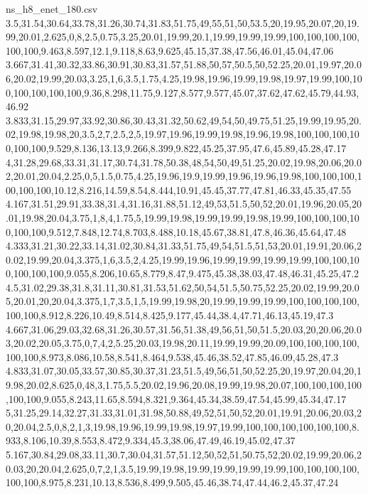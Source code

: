 \begin{filecontents*}[overwrite]{ns_h8_enet_180.csv}
3.5,31.54,30.64,33.78,31.26,30.74,31.83,51.75,49,55,51,50,53.5,20,19.95,20.07,20,19.99,20.01,2.625,0,8,2.5,0.75,3.25,20.01,19.99,20.1,19.99,19.99,19.99,100,100,100,100,100,100,9.463,8.597,12.1,9.118,8.63,9.625,45.15,37.38,47.56,46.01,45.04,47.06
3.667,31.41,30.32,33.86,30.91,30.83,31.57,51.88,50,57,50.5,50,52.25,20.01,19.97,20.06,20.02,19.99,20.03,3.25,1,6,3.5,1.75,4.25,19.98,19.96,19.99,19.98,19.97,19.99,100,100,100,100,100,100,9.36,8.298,11.75,9.127,8.577,9.577,45.07,37.62,47.62,45.79,44.93,46.92
3.833,31.15,29.97,33.92,30.86,30.43,31.32,50.62,49,54,50,49.75,51.25,19.99,19.95,20.02,19.98,19.98,20,3.5,2,7,2.5,2,5,19.97,19.96,19.99,19.98,19.96,19.98,100,100,100,100,100,100,9.529,8.136,13.13,9.266,8.399,9.822,45.25,37.95,47.6,45.89,45.28,47.17
4,31.28,29.68,33.31,31.17,30.74,31.78,50.38,48,54,50,49,51.25,20.02,19.98,20.06,20.02,20.01,20.04,2.25,0,5,1.5,0.75,4.25,19.96,19.9,19.99,19.96,19.96,19.98,100,100,100,100,100,100,10.12,8.216,14.59,8.54,8.444,10.91,45.45,37.77,47.81,46.33,45.35,47.55
4.167,31.51,29.91,33.38,31.4,31.16,31.88,51.12,49,53,51.5,50,52,20.01,19.96,20.05,20.01,19.98,20.04,3.75,1,8,4,1.75,5,19.99,19.98,19.99,19.99,19.98,19.99,100,100,100,100,100,100,9.512,7.848,12.74,8.703,8.488,10.18,45.67,38.81,47.8,46.36,45.64,47.48
4.333,31.21,30.22,33.14,31.02,30.84,31.33,51.75,49,54,51.5,51,53,20.01,19.91,20.06,20.02,19.99,20.04,3.375,1,6,3.5,2,4.25,19.99,19.96,19.99,19.99,19.99,19.99,100,100,100,100,100,100,9.055,8.206,10.65,8.779,8.47,9.475,45.38,38.03,47.48,46.31,45.25,47.2
4.5,31.02,29.38,31.8,31.11,30.81,31.53,51.62,50,54,51.5,50.75,52.25,20.02,19.99,20.05,20.01,20,20.04,3.375,1,7,3.5,1,5,19.99,19.98,20,19.99,19.99,19.99,100,100,100,100,100,100,8.912,8.226,10.49,8.514,8.425,9.177,45.44,38.4,47.71,46.13,45.19,47.3
4.667,31.06,29.03,32.68,31.26,30.57,31.56,51.38,49,56,51,50,51.5,20.03,20,20.06,20.03,20.02,20.05,3.75,0,7,4,2,5.25,20.03,19.98,20.11,19.99,19.99,20.09,100,100,100,100,100,100,8.973,8.086,10.58,8.541,8.464,9.538,45.46,38.52,47.85,46.09,45.28,47.3
4.833,31.07,30.05,33.57,30.85,30.37,31.23,51.5,49,56,51,50,52.25,20,19.97,20.04,20,19.98,20.02,8.625,0,48,3,1.75,5.5,20.02,19.96,20.08,19.99,19.98,20.07,100,100,100,100,100,100,9.055,8.243,11.65,8.594,8.321,9.364,45.34,38.59,47.54,45.99,45.34,47.17
5,31.25,29.14,32.27,31.33,31.01,31.98,50.88,49,52,51,50,52,20.01,19.91,20.06,20.03,20,20.04,2.5,0,8,2,1,3,19.98,19.96,19.99,19.98,19.97,19.99,100,100,100,100,100,100,8.933,8.106,10.39,8.553,8.472,9.334,45.3,38.06,47.49,46.19,45.02,47.37
5.167,30.84,29.08,33.11,30.7,30.04,31.57,51.12,50,52,51,50.75,52,20.02,19.99,20.06,20.03,20,20.04,2.625,0,7,2,1,3.5,19.99,19.98,19.99,19.99,19.99,19.99,100,100,100,100,100,100,8.975,8.231,10.13,8.536,8.499,9.505,45.46,38.74,47.44,46.2,45.37,47.24

\end{filecontents*}
